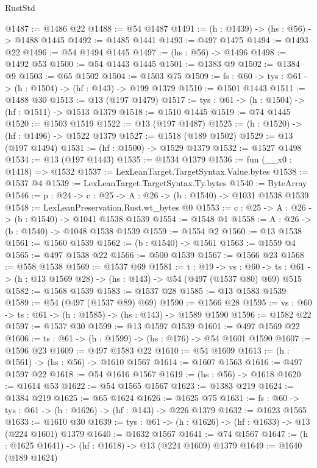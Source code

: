 \begin{lexlean}{RustStd}
\begin{coremodule}
@1487 := @1486 @22
@1488 := @54 @1487
@1491 := (h : @1439) -> (hs : @56) -> @1488 @1445
@1492 := @1485 @1441
@1493 := @497 @1475
@1494 := @1493 @22
@1496 := @54 @1494 @1445
@1497 := (hs : @56) -> @1496
@1498 := @1492 @53
@1500 := @54 @1443 @1445
@1501 := @1383 @9
@1502 := @1384 @9
@1503 := @65 @1502
@1504 := @1503 @75
@1509 := {fs : @60} -> {tys : @61} -> (h : @1504) -> (hf : @143) -> @199 @1379
@1510 := @1501 @1443
@1511 := @1488 @30
@1513 := @13 (@197 @1479)
@1517 := {tys : @61} -> (h : @1504) -> (hf : @1511) -> @1513 @1379
@1518 := @1510 @1445
@1519 := @74 @1445
@1520 := @1503 @1519
@1522 := @13 (@197 @1487)
@1525 := (h : @1520) -> (hf : @1496) -> @1522 @1379
@1527 := @1518 (@189 @1502)
@1529 := @13 (@197 @1494)
@1531 := (hf : @1500) -> @1529 @1379
@1532 := @1527 @1498
@1534 := @13 (@197 @1443)
@1535 := @1534 @1379
@1536 := fun (__x0 : @1418) => @1532
@1537 := LexLeanTarget.TargetSyntax.Value.bytes
@1538 := @1537 @4
@1539 := LexLeanTarget.TargetSyntax.Ty.bytes
@1540 := ByteArray
@1546 := {p : @24} -> {c : @25} -> {A : @26} -> (b : @1540) -> @1031 @1538 @1539
@1548 := LexLeanPreservation.Rust.wt_bytes @0
@1553 := {c : @25} -> {A : @26} -> (b : @1540) -> @1041 @1538 @1539
@1554 := @1548 @1
@1558 := {A : @26} -> (b : @1540) -> @1048 @1538 @1539
@1559 := @1554 @2
@1560 := @13 @1538
@1561 := @1560 @1539
@1562 := (b : @1540) -> @1561
@1563 := @1559 @4
@1565 := @497 @1538 @22
@1566 := @500 @1539
@1567 := @1566 @23
@1568 := @558 @1538
@1569 := @1537 @69
@1581 := {t : @19} ->
  {vs : @60} -> {ts : @61} -> (h : @13 @1569 @28) -> (hs : @143) -> @54 (@497 (@1537 @80) @69) @515
@1582 := @1568 @1539
@1583 := @1537 @28
@1585 := @13 @1583 @1539
@1589 := @54 (@497 (@1537 @89) @69)
@1590 := @1566 @28
@1595 := {vs : @60} -> {ts : @61} -> (h : @1585) -> (hs : @143) -> @1589 @1590
@1596 := @1582 @22
@1597 := @1537 @30
@1599 := @13 @1597 @1539
@1601 := @497 @1569 @22
@1606 := {ts : @61} -> (h : @1599) -> (hs : @176) -> @54 @1601 @1590
@1607 := @1596 @23
@1609 := @497 @1583 @22
@1610 := @54 @1609
@1613 := (h : @1561) -> (hs : @56) -> @1610 @1567
@1614 := @1607 @1563
@1616 := @497 @1597 @22
@1618 := @54 @1616 @1567
@1619 := (hs : @56) -> @1618
@1620 := @1614 @53
@1622 := @54 @1565 @1567
@1623 := @1383 @219
@1624 := @1384 @219
@1625 := @65 @1624
@1626 := @1625 @75
@1631 := {fs : @60} -> {tys : @61} -> (h : @1626) -> (hf : @143) -> @226 @1379
@1632 := @1623 @1565
@1633 := @1610 @30
@1639 := {tys : @61} -> (h : @1626) -> (hf : @1633) -> @13 (@224 @1601) @1379
@1640 := @1632 @1567
@1641 := @74 @1567
@1647 := (h : @1625 @1641) -> (hf : @1618) -> @13 (@224 @1609) @1379
@1649 := @1640 (@189 @1624)

\end{coremodule}
\end{lexlean}
